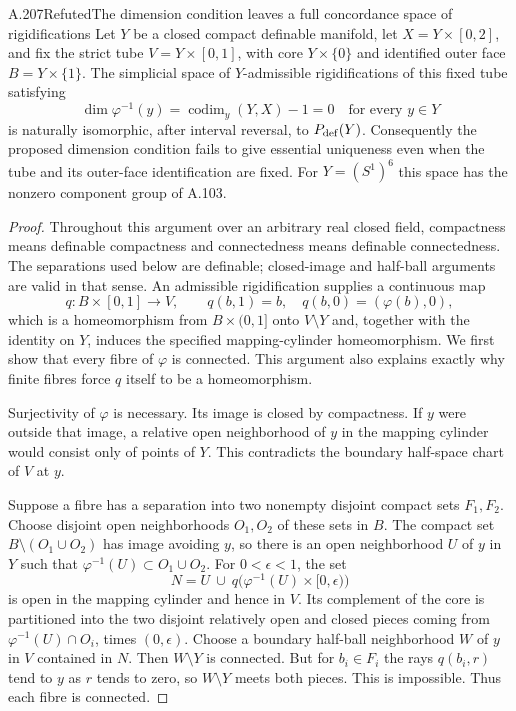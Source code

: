 \begin{saresult}{A.207}{Refuted}{The dimension condition leaves a full concordance space of rigidifications}
Let $Y$ be a closed compact definable manifold, let
$X=Y\times[0,2]$, and fix the strict tube
$V=Y\times[0,1]$, with core $Y\times\{0\}$ and identified outer
face $B=Y\times\{1\}$. The simplicial space of $Y$-admissible
rigidifications of this fixed tube satisfying
\[
 \dim\varphi^{-1}(y)=\operatorname{codim}_y(Y,X)-1=0
 \quad\text{for every }y\in Y
\]
is naturally isomorphic, after interval reversal, to
$P_{\rm def}(Y)$. Consequently the proposed dimension condition
fails to give essential uniqueness even when the tube and its
outer-face identification are fixed. For $Y=(S^1)^6$ this space
has the nonzero component group of A.103.
\end{saresult}
\begin{proof}
Throughout this argument over an arbitrary real closed field,
compactness means definable compactness and connectedness means
definable connectedness. The separations used below are definable;
closed-image and half-ball arguments are valid in that sense.
An admissible rigidification supplies a continuous map
\[
 q:B\times[0,1]\longrightarrow V,
 \qquad q(b,1)=b,\quad q(b,0)=(\varphi(b),0),
\]
which is a homeomorphism from $B\times(0,1]$ onto $V\setminus Y$
and, together with the identity on $Y$, induces the specified
mapping-cylinder homeomorphism. We first show that every fibre
of $\varphi$ is connected. This argument also explains exactly
why finite fibres force $q$ itself to be a homeomorphism.

Surjectivity of $\varphi$ is necessary. Its image is closed by
compactness. If $y$ were outside that image, a relative open
neighborhood of $y$ in the mapping cylinder would consist only
of points of $Y$. This contradicts the boundary half-space chart
of $V$ at $y$.

Suppose a fibre has a separation into two nonempty disjoint
compact sets $F_1,F_2$. Choose disjoint open neighborhoods
$O_1,O_2$ of these sets in $B$. The compact set
$B\setminus(O_1\cup O_2)$ has image avoiding $y$, so there is an
open neighborhood $U$ of $y$ in $Y$ such that
$\varphi^{-1}(U)\subset O_1\cup O_2$. For $0<\epsilon<1$, the
set
\[
 N=U\ \cup\ q\bigl(\varphi^{-1}(U)\times[0,\epsilon)\bigr)
\]
is open in the mapping cylinder and hence in $V$. Its complement
of the core is partitioned into the two disjoint relatively open
and closed pieces coming from
$\varphi^{-1}(U)\cap O_i$, times $(0,\epsilon)$.
Choose a boundary half-ball neighborhood $W$ of $y$ in $V$
contained in $N$. Then $W\setminus Y$ is connected. But for
$b_i\in F_i$ the rays $q(b_i,r)$ tend to $y$ as $r$ tends to
zero, so $W\setminus Y$ meets both pieces. This is impossible.
Thus each fibre is connected.


\end{proof}
